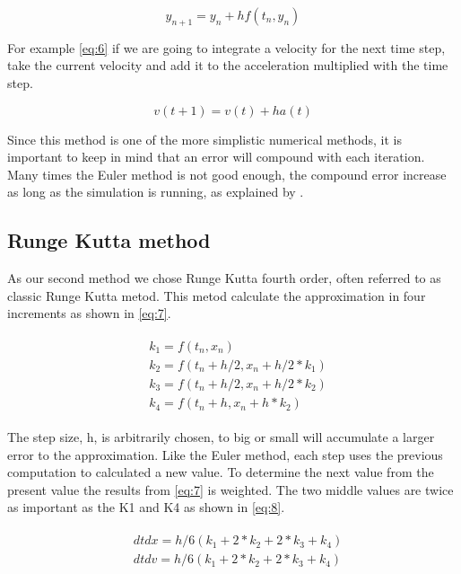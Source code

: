 \documentclass[a4paper,12pt]{report}
\begin{document}
\begin{equation}
y_{n+1}=y_{n}+hf(t_n, y_n)
\label{eq:5}
\end{equation}

For example \ref{eq:6} if we are going to integrate a velocity for the next time step, take the current velocity and add it to the acceleration multiplied with the time step.

\begin{equation}
v(t+1)=v(t)+ha(t)
\label{eq:6}
\end{equation}

Since this method is one of the more simplistic numerical methods, it is important to keep in mind that an error will compound with each iteration. Many times the Euler method is not good enough, the compound error increase as long as the simulation is running, as explained by \cite{gog}.

\subsection{Runge Kutta method}

As our second method we chose Runge Kutta fourth order, often referred to as classic Runge Kutta metod. This metod calculate the approximation in four increments as shown in \ref{eq:7}.

\begin{equation}
\begin{split}
\begin{aligned}
& k_{1} = f(t_{n}, x_{n}) \\
& k_{2} = f(t_{n}+h/2, x_{n}+h/2*k_{1}) \\
& k_{3} = f(t_{n}+h/2, x_{n}+h/2*k_{2}) \\
& k_{4} = f(t_{n}+h, x_{n}+h*k_{2})
\end{aligned}
\end{split}
\label{eq:7}
\end{equation}

The step size, h, is arbitrarily chosen, to big or small will accumulate a larger error to the approximation. Like the Euler method, each step uses the previous computation to calculated a new value. To determine the next value from the present value the results from \ref{eq:7} is weighted. The two middle values are twice as important as the K1 and K4 as shown in \ref{eq:8}.

\begin{equation}
\begin{split}
\begin{aligned}
& dtdx = h/6(k_{1}+2*k_{2}+2*k_{3}+k_{4}) \\
& dtdv = h/6(k_{1}+2*k_{2}+2*k_{3}+k_{4})
\end{aligned}
\end{split}
\label{eq:8}
\end{equation}
\end{document}
